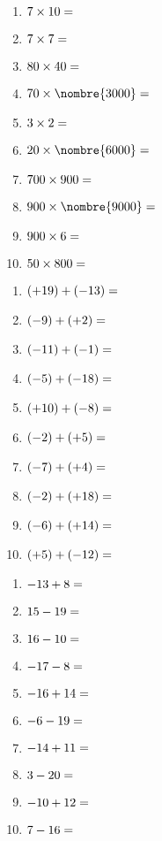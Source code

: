 \documentclass[a4paper,11pt,fleqn]{article}
\begin{document}


\begin{multicols}{2}
\begin{enumerate}[itemsep=2em]
	\item $ 7 \times 10 = \dotfill $
	\item $ 7 \times 7 = \dotfill $
	\item $ 80 \times 40 = \dotfill $
	\item $ 70 \times \nombre{3000} = \dotfill $
	\item $ 3 \times 2 = \dotfill $
	\item $ 20 \times \nombre{6000} = \dotfill $
	\item $ 700 \times 900 = \dotfill $
	\item $ 900 \times \nombre{9000} = \dotfill $
	\item $ 900 \times 6 = \dotfill $
	\item $ 50 \times 800 = \dotfill $
\end{enumerate}
\end{multicols}


\begin{multicols}{2}
\begin{enumerate}[itemsep=2em]
	\item $ (+19) + (-13) = \dotfill $
	\item $ (-9) + (+2) = \dotfill $
	\item $ (-11) + (-1) = \dotfill $
	\item $ (-5) + (-18) = \dotfill $
	\item $ (+10) + (-8) = \dotfill $
	\item $ (-2) + (+5) = \dotfill $
	\item $ (-7) + (+4) = \dotfill $
	\item $ (-2) + (+18) = \dotfill $
	\item $ (-6) + (+14) = \dotfill $
	\item $ (+5) + (-12) = \dotfill $
\end{enumerate}
\end{multicols}


\begin{multicols}{2}
\begin{enumerate}[itemsep=2em]
	\item $ -13+8 = \dotfill $
	\item $ 15-19 = \dotfill $
	\item $ 16-10 = \dotfill $
	\item $ -17-8 = \dotfill $
	\item $ -16+14 = \dotfill $
	\item $ -6-19 = \dotfill $
	\item $ -14+11 = \dotfill $
	\item $ 3-20 = \dotfill $
	\item $ -10+12 = \dotfill $
	\item $ 7-16 = \dotfill $
\end{enumerate}
\end{multicols}
\end{document}
